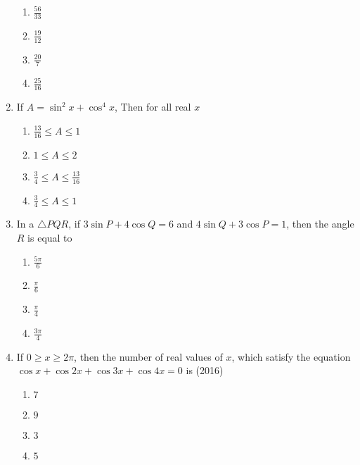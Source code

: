 \begin{enumerate}[label=\thesubsection.\arabic*,ref=\thesubsection.\theenumi]
\begin{multicols}{4}
\begin{enumerate}
\item $\frac{56}{33}$
\columnbreak
\item $\frac{19}{12}$
\columnbreak
\item $\frac{20}{7}$
\columnbreak
\item $\frac{25}{16}$
\end{enumerate} 
\end{multicols}
\item If $A=\sin^2x +\cos^4 x$, Then for all real $x$
\hfill{}
\begin{multicols}{4} 
\begin{enumerate}
\item $\frac{13}{16}\le A\le1$
\item $1\le A \le2$
\columnbreak
\item $\frac{3}{4}\le A \le\frac{13}{16}$
\item $\frac{3}{4}\le A \le1$
\end{enumerate} 
\end{multicols}
\item In a ${\triangle PQR}$, if $3 \sin {P} + 4 \cos {Q}=6$ and $4\sin {Q}+3\cos {P}=1$, then the angle ${R}$ is equal to
\hfill{}
\begin{multicols}{4}
\begin{enumerate}
\item $\frac{5\pi}{6}$
\columnbreak
\item $\frac{\pi}{6}$
\columnbreak
\item $\frac{\pi}{4}$
\columnbreak
\item $\frac{3\pi}{4}$
\end{enumerate} 
\end{multicols}
\item If $0 \ge x \ge 2\pi$, then the number of real values of $x$, which   satisfy the equation $\cos x+\cos2x+\cos3x+\cos4x=0$ is
%
\hfill {(2016)}
\begin{multicols}{4}
    \begin{enumerate}
    \item $7$
    \item $9$
    \item $3$
    \item $5$
    \end{enumerate}
\end{multicols}
    

\end{enumerate}
